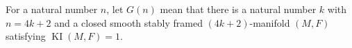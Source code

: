 \begin{definition}
\label{sem:Literature:kervaire-existence}
For a natural number $n$, let $G(n)$ mean that there is a natural number
$k$ with $n=4k+2$ and a closed smooth stably framed $(4k+2)$-manifold
$(M,F)$ satisfying $\operatorname{KI}(M,F)=1$.
\end{definition}
